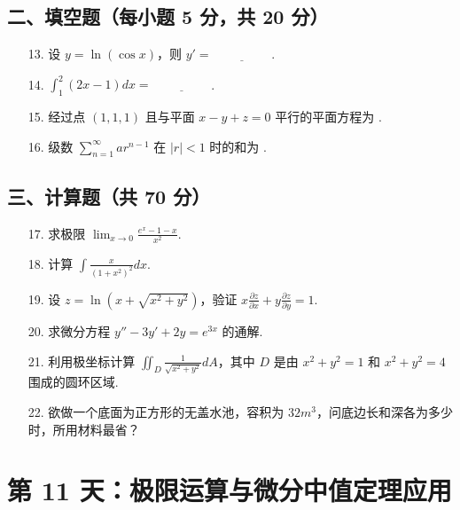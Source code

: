 \documentclass[11pt,a4paper]{article}
\begin{document}
\subsection*{二、填空题（每小题 5 分，共 20 分）}
\begin{enumerate}
    \item[13.] 设 $y = \ln(\cos x)$，则 $y' = \underline{\hspace{2cm}}$.
    \item[14.] $\int_1^2 (2x-1) dx = \underline{\hspace{2cm}}$.
    \item[15.] 经过点 $(1,1,1)$ 且与平面 $x-y+z=0$ 平行的平面方程为 \underline{\hspace{2cm}}.
    \item[16.] 级数 $\sum_{n=1}^{\infty} ar^{n-1}$ 在 $|r|<1$ 时的和为 \underline{\hspace{2cm}}.
\end{enumerate}
\subsection*{三、计算题（共 70 分）}
\begin{enumerate}
    \item[17.] 求极限 $\lim_{x \to 0} \frac{e^x - 1 - x}{x^2}$.
    \item[18.] 计算 $\int \frac{x}{(1+x^2)^2} dx$.
    \item[19.] 设 $z = \ln(x + \sqrt{x^2+y^2})$，验证 $x \frac{\partial z}{\partial x} + y \frac{\partial z}{\partial y} = 1$.
    \item[20.] 求微分方程 $y'' - 3y' + 2y = e^{3x}$ 的通解.
    \item[21.] 利用极坐标计算 $\iint_D \frac{1}{\sqrt{x^2+y^2}} dA$，其中 $D$ 是由 $x^2+y^2=1$ 和 $x^2+y^2=4$ 围成的圆环区域.
    \item[22.] 欲做一个底面为正方形的无盖水池，容积为 $32 m^3$，问底边长和深各为多少时，所用材料最省？
\end{enumerate}

\newpage

\section*{第 11 天：极限运算与微分中值定理应用}
\end{document}
